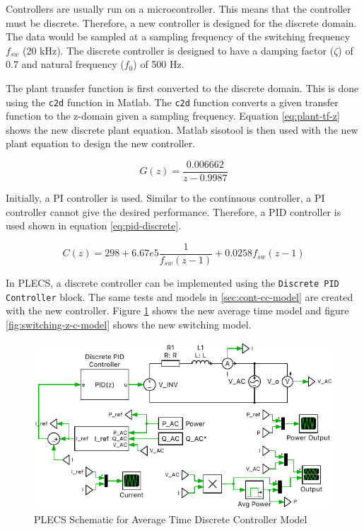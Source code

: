 \documentclass[12pt]{article}
\begin{document}
Controllers are usually run on a microcontroller.
This means that the controller must be discrete.
Therefore, a new controller is designed for the discrete domain.
The data would be sampled at a sampling frequency of the switching frequency $f_{sw}$ (20 kHz).
The discrete controller is designed to have a damping factor ($\zeta$) of 0.7 and natural frequency ($f_0$) of 500 Hz.

The plant transfer function is first converted to the discrete domain.
This is done using the \lstinline{c2d} function in Matlab.
The \lstinline{c2d} function converts a given transfer function to the z-domain given a sampling frequency.
Equation \ref{eq:plant-tf-z} shows the new discrete plant equation.
Matlab sisotool is then used with the new plant equation to design the new controller.

\begin{equation} \label{eq:plant-tf-z}
    G(z) = \frac{0.006662}{z - 0.9987}
\end{equation}

Initially, a PI controller is used.
Similar to the continuous controller, a PI controller cannot give the desired performance.
Therefore, a PID controller is used shown in equation \ref{eq:pid-discrete}.

\begin{equation} \label{eq:pid-discrete}
    C(z) = 298 + 6.67e5 \frac{1}{f_{sw} (z - 1)} + 0.0258 f_{sw} (z - 1)
\end{equation}

In PLECS, a discrete controller can be implemented using the \lstinline[breaklines]{Discrete PID Controller} block.
The same tests and models in \ref{sec:cont-cc-model} are created with the new controller.
Figure \ref{fig:avg-time-z-c-model} shows the new average time model and figure \ref{fig:switching-z-c-model} shows the new switching model.

\begin{figure}[ht]
    \centering{}
    \includegraphics[width=\textwidth, height=0.4\textheight, keepaspectratio]{img/Average Time Z-C Model.pdf}
    \caption{PLECS Schematic for Average Time Discrete Controller Model}
    \label{fig:avg-time-z-c-model}
\end{figure}
\end{document}

